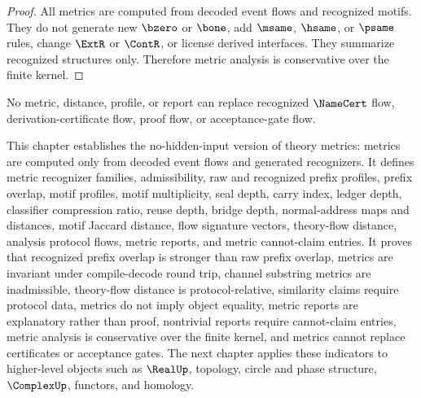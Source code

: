\begin{proof}
All metrics are computed from decoded event flows and recognized motifs. They do not generate new $\bzero$ or $\bone$, add $\msame$, $\hsame$, or $\psame$ rules, change $\ExtR$ or $\ContR$, or license derived interfaces. They summarize recognized structures only. Therefore metric analysis is conservative over the finite kernel.
\end{proof}

\begin{corollary}
\label{cor:metrics-cannot-replace-certificates}
No metric, distance, profile, or report can replace recognized $\NameCert$ flow, derivation-certificate flow, proof flow, or acceptance-gate flow.
\end{corollary}

\begin{remark}[Outlook]
\label{rem:metrics-outlook}
This chapter establishes the no-hidden-input version of theory metrics: metrics are computed only from decoded event flows and generated recognizers. It defines metric recognizer families, admissibility, raw and recognized prefix profiles, prefix overlap, motif profiles, motif multiplicity, seal depth, carry index, ledger depth, classifier compression ratio, reuse depth, bridge depth, normal-address maps and distances, motif Jaccard distance, flow signature vectors, theory-flow distance, analysis protocol flows, metric reports, and metric cannot-claim entries. It proves that recognized prefix overlap is stronger than raw prefix overlap, metrics are invariant under compile-decode round trip, channel substring metrics are inadmissible, theory-flow distance is protocol-relative, similarity claims require protocol data, metrics do not imply object equality, metric reports are explanatory rather than proof, nontrivial reports require cannot-claim entries, metric analysis is conservative over the finite kernel, and metrics cannot replace certificates or acceptance gates. The next chapter applies these indicators to higher-level objects such as $\RealUp$, topology, circle and phase structure, $\ComplexUp$, functors, and homology.
\end{remark}
